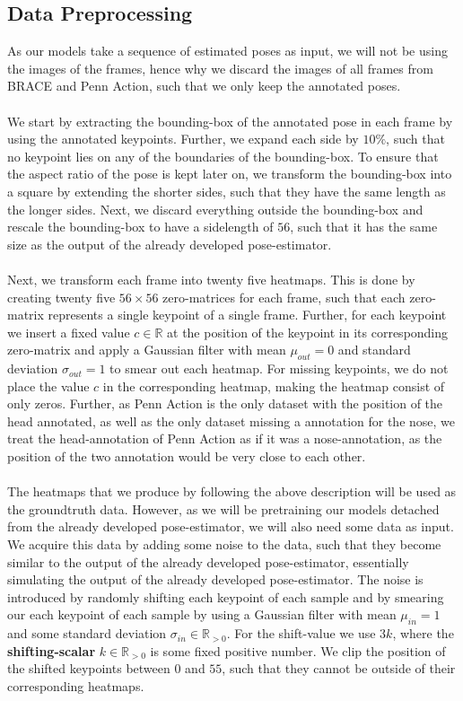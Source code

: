 \documentclass[./main.tex]{subfiles}
\begin{document}
\subsection{Data Preprocessing}
As our models take a sequence of estimated poses as input, we will not be using the images of the frames, hence why we discard the images of all frames from BRACE and Penn Action, such that we only keep the annotated poses.
\\
\\
We start by extracting the bounding-box of the annotated pose in each frame by using the annotated keypoints. Further, we expand each side by $10\%$, such that no keypoint lies on any of the boundaries of the bounding-box. To ensure that the aspect ratio of the pose is kept later on, we transform the bounding-box into a square by extending the shorter sides, such that they have the same length as the longer sides. Next, we discard everything outside the bounding-box and rescale the bounding-box to have a sidelength of $56$, such that it has the same size as the output of the already developed pose-estimator.
\\
\\
Next, we transform each frame into twenty five heatmaps. This is done by creating twenty five $56 \times 56$ zero-matrices for each frame, such that each zero-matrix represents a single keypoint of a single frame. Further, for each keypoint we insert a fixed value $c \in \mathbb{R}$ at the position of the keypoint in its corresponding zero-matrix and apply a Gaussian filter with mean $\mu_{out} = 0$ and standard deviation $\sigma_{out} = 1$ to smear out each heatmap. For missing keypoints, we do not place the value $c$ in the corresponding heatmap, making the heatmap consist of only zeros. Further, as Penn Action is the only dataset with the position of the head annotated, as well as the only dataset missing a annotation for the nose, we treat the head-annotation of Penn Action as if it was a nose-annotation, as the position of the two annotation would be very close to each other.
\\
\\
The heatmaps that we produce by following the above description will be used as the groundtruth data. However, as we will be pretraining our models detached from the already developed pose-estimator, we will also need some data as input. We acquire this data by adding some noise to the data, such that they become similar to the output of the already developed pose-estimator, essentially simulating the output of the already developed pose-estimator. The noise is introduced by randomly shifting each keypoint of each sample and by smearing our each keypoint of each sample by using a Gaussian filter with mean $\mu_{in} = 1$ and some standard deviation $\sigma_{in} \in \mathbb{R}_{>0}$. For the shift-value we use $3k$, where the \textbf{shifting-scalar} $k \in \mathbb{R}_{>0}$ is some fixed positive number. We clip the position of the shifted keypoints between $0$ and $55$, such that they cannot be outside of their corresponding heatmaps. 
\end{document}

